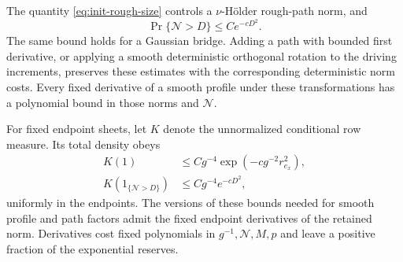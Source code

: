 \begin{lemma}
\label{lem:init-path-estimates}
The quantity \eqref{eq:init-rough-size} controls a $\nu$-H\"older rough-path
norm, and
\[
 \Pr\{\mathcal N>D\}\le C e^{-cD^2}.
\]
The same bound holds for a Gaussian bridge.  Adding a path with bounded
first derivative, or applying a smooth deterministic orthogonal rotation
to the driving increments, preserves these estimates with the corresponding
deterministic norm costs.  Every fixed derivative of a smooth profile
under these transformations has a polynomial bound in those norms and
$\mathcal N$.

For fixed endpoint sheets, let $K$ denote the unnormalized conditional
row measure.  Its total density obeys
\begin{align}
 K(1)&\le Cg^{-4}\exp(-cg^{-2}r_{e_x}^2),
 \label{eq:init-heat-bound}\\
 K(1_{\{\mathcal N>D\}})&\le Cg^{-4}e^{-cD^2},
 \label{eq:init-conditioned-tail}
\end{align}
uniformly in the endpoints.  The versions of these bounds needed for
smooth profile and path factors admit the fixed endpoint derivatives of
the retained norm.  Derivatives cost fixed polynomials in
$g^{-1},\mathcal N,M,p$ and leave a positive fraction of the exponential
reserves.
\end{lemma}

